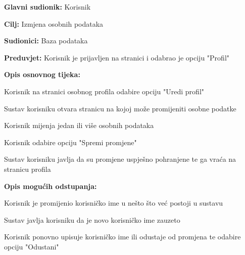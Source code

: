 					\noindent {}
					\begin{packed_item}
	\item \textbf{Glavni sudionik:} Korisnik
	\item  \textbf{Cilj:} Izmjena osobnih podataka
	\item  \textbf{Sudionici:} Baza podataka
	\item  \textbf{Preduvjet:} Korisnik je prijavljen na stranici i odabrao je opciju "Profil"
	\item  \textbf{Opis osnovnog tijeka:}
	
	\item[] \begin{packed_enum}
		
		\item Korisnik na stranici osobnog profila odabire opciju "Uredi profil"
		\item Sustav korisniku otvara stranicu na kojoj može promijeniti osobne podatke
		\item Korisnik mijenja jedan ili više osobnih podataka
		\item Korisnik odabire opciju "Spremi promjene"
		\item Sustav korisniku javlja da su promjene uspješno pohranjene te ga vraća na stranicu profila
	\end{packed_enum}
	
	\item  \textbf{Opis mogućih odstupanja:}
	
	\item[] \begin{packed_item}
		
		\item[4.a] Korisnik je promijenio korisničko ime u nešto što već postoji u sustavu
		\item[] \begin{packed_enum}
			
			\item Sustav javlja korisniku da je novo korisničko ime zauzeto
			\item Korisnik ponovno upisuje korisničko ime ili odustaje od promjena te odabire opciju "Odustani"
			
		\end{packed_enum}
	\end{packed_item}
\end{packed_item}


